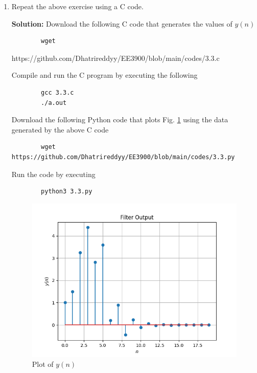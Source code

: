 \documentclass[journal,12pt,twocolumn]{IEEEtran}
\newcommand{\solution}{\noindent \textbf{Solution: }}
\numberwithin{equation}{section}
\renewcommand\thesection{\arabic{section}}
\begin{document}
\begin{enumerate}[label=\thesection.\arabic*,ref=\thesection.\theenumi]
	\item Repeat the above exercise using a C code.
	
	\solution Download the following C code that generates the values of $y(n)$
	\begin{lstlisting}
		wget 
	\end{lstlisting}https://github.com/Dhatrireddyy/EE3900/blob/main/codes/3.3.c
	
	Compile and run the C program by executing the following
	\begin{lstlisting}
		gcc 3.3.c
		./a.out
	\end{lstlisting}
	
	Download the following Python code that plots Fig. \ref{fig-3.3} using the data generated by the above C code
	\begin{lstlisting}
		wget https://github.com/Dhatrireddyy/EE3900/blob/main/codes/3.3.py
	\end{lstlisting}
	
	Run the code by executing
	\begin{lstlisting}
		python3 3.3.py
	\end{lstlisting}

	\begin{figure}[!ht]
		\centering
		\includegraphics[width=\columnwidth]{figs/3.3.png}
		\caption{Plot of $y(n)$}
		\label{fig-3.3}	
	\end{figure}
	
	\end{enumerate}
	
\end{document}
